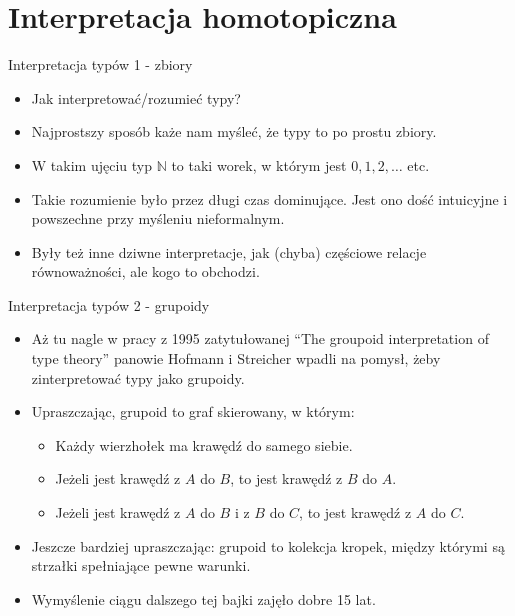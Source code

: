 \documentclass{beamer}
\begin{document}
\section{Interpretacja homotopiczna}

\begin{frame}{Interpretacja typów 1 - zbiory}
\begin{itemize}
	\item Jak interpretować/rozumieć typy?
	\item Najprostszy sposób każe nam myśleć, że typy to po prostu zbiory.
	\item W takim ujęciu typ $\mathbb{N}$ to taki worek, w którym jest $0, 1, 2, \dots$ etc.
	\item Takie rozumienie było przez długi czas dominujące. Jest ono dość intuicyjne i powszechne przy myśleniu nieformalnym.
	\item Były też inne dziwne interpretacje, jak (chyba) częściowe relacje równoważności, ale kogo to obchodzi.
\end{itemize}
\end{frame}

\begin{frame}{Interpretacja typów 2 - grupoidy}
\begin{itemize}
	\item Aż tu nagle w pracy z 1995 zatytułowanej ``The groupoid interpretation of type theory'' panowie Hofmann i Streicher wpadli na pomysł, żeby zinterpretować typy jako grupoidy.
	\item Upraszczając, grupoid to graf skierowany, w którym:
	\begin{itemize}
		\item Każdy wierzhołek ma krawędź do samego siebie.
		\item Jeżeli jest krawędź z $A$ do $B$, to jest krawędź z $B$ do $A$.
		\item Jeżeli jest krawędź z $A$ do $B$ i z $B$ do $C$, to jest krawędź z $A$ do $C$.
	\end{itemize}
	\item Jeszcze bardziej upraszczając: grupoid to kolekcja kropek, między którymi są strzałki spełniające pewne warunki.
	\item Wymyślenie ciągu dalszego tej bajki zajęło dobre 15 lat.
\end{itemize}
\end{frame}
\end{document}
